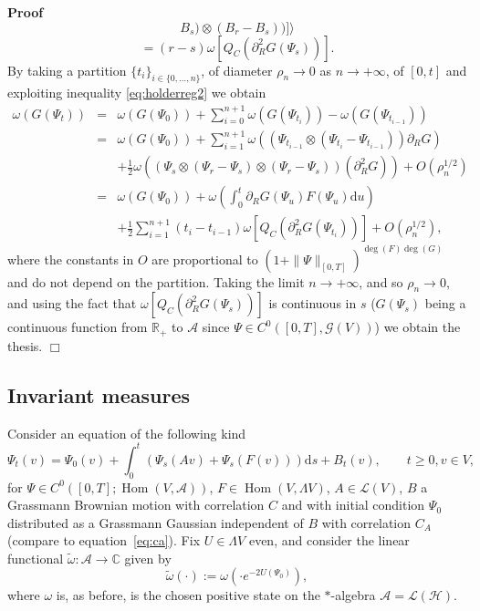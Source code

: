 \documentclass{article}
\newcommand{\assign}{:=}
\newcommand{\asterisk}{\mathord{*}}
\newcommand{\mathd}{\mathrm{d}}
\newcommand{\tmop}[1]{\ensuremath{\operatorname{#1}}}
\newenvironment{proof}{\noindent\textbf{Proof\ }}{\hspace*{\fill}$\Box$\medskip}
\begin{document}
\begin{proof}
\[     B_s) \otimes (B_r - B_s))] \rangle \]
  \[ = (r - s) \omega [Q_C (\partial_R^2 G (\Psi_s))] . \]
  By taking a partition $\{ t_i \}_{i \in \{ 0, \ldots, n \}}$, of diameter
  $\rho_n \rightarrow 0$ as $n \rightarrow + \infty$, of $[0, t]$ and
  exploiting inequality {\eqref{eq:holderreg2}} we obtain
  \[ \begin{array}{lll}
       \omega (G (\Psi_t)) & = & \omega (G (\Psi_0)) + \sum_{i = 0}^{n + 1}
       \omega (G (\Psi_{t_i})) - \omega (G (\Psi_{t_{i - 1}}))\\
       & = & \omega (G (\Psi_0)) + \sum_{i = 1}^{n + 1} \omega ((\Psi_{t_{i -
       1}} \otimes (\Psi_{t_i} - \Psi_{t_{i - 1}})) \partial_R G)\\
       &  & + \frac{1}{2} \omega ((\Psi_s \otimes (\Psi_r - \Psi_s) \otimes
       (\Psi_r - \Psi_s)) (\partial_R^2 G)) + O (\rho_n^{1 / 2})\\
       & = & \omega (G (\Psi_0)) + \omega \left( \int_0^t \partial_R G
       (\Psi_u) F (\Psi_u) \mathd u \right)\\
       &  & + \frac{1}{2} \sum_{i = 1}^{n + 1} (t_i - t_{i - 1}) \omega [Q_C
       (\partial_R^2 G (\Psi_{t_i}))] + O (\rho_n^{1 / 2}),
     \end{array} \]
  where the constants in $O$ are proportional to $(1 + \| \Psi \|_{[0,
  T]})^{\deg (F) \deg (G)}$ and do not depend on the partition. Taking the
  limit $n \rightarrow + \infty$, and so $\rho_n \rightarrow 0$, and using the
  fact that $\omega [Q_C (\partial_R^2 G (\Psi_s))]$ is continuous in $s$ ($G
  (\Psi_s)$ being a continuous function from $\mathbb{R}_+$ to $\mathcal{A}$
  since $\Psi \in C^0 ([0, T], \mathcal{G} (V))$) we obtain the thesis.
\end{proof}

\subsection{Invariant measures}\label{sec:inv-meas}

Consider an equation of the following kind
\begin{equation}
  \Psi_t (v) = \Psi_0 (v) + \int_0^t (\Psi_s (A v) + \Psi_s (F (v))) \mathd s
  + B_t (v), \qquad t \geqslant 0, v \in V, \label{eq:sde-langevin-0}
\end{equation}
for $\Psi \in C^0 ([0, T] ; \tmop{Hom} (V, \mathcal{A}))$, $F \in \tmop{Hom}
(V, \Lambda V)$, $A \in \mathcal{L} (V)$, $B$ a Grassmann Brownian motion with
correlation $C$ and with initial condition $\Psi_0$ distributed as a Grassmann
Gaussian independent of $B$ with correlation $C_A$ (compare to
equation~{\eqref{eq:ca}}). Fix $U \in \Lambda V$ even, and consider the linear
functional $\tilde{\omega} : \mathcal{A} \rightarrow \mathbb{C}$ given by
\begin{equation}
  \tilde{\omega} (\cdot) \assign \omega (\cdot e^{- 2 U (\Psi_0)}),
  \label{eq:gibbs-U}
\end{equation}
where $\omega$ is, as before, is the chosen positive state on the
$\asterisk$-algebra $\mathcal{A} = \mathcal{L} (\mathcal{H})$.
\end{document}
